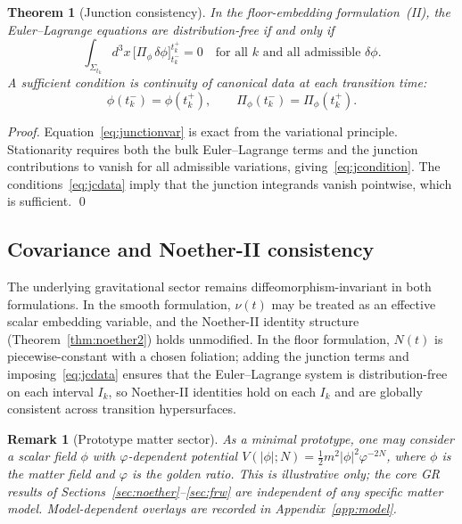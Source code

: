\documentclass[12pt,a4paper]{article}
\newtheorem{theorem}{Theorem}[section]
\newtheorem{remark}{Remark}[section]
\newcommand{\Sig}{\Sigma}           %
\newcommand{\NN}{N}          %
\newcommand{\nnu}{\nu}       %
\begin{document}
\begin{theorem}[Junction consistency]
\label{thm:junction}
In the floor-embedding formulation~(II), the
Euler--Lagrange equations are distribution-free if and only if
\begin{equation}
  \int_{\Sig_{t_k}} d^3x\,\bigl[\Pi_\phi\,\delta\phi\bigr]^{t_k^+}_{t_k^-}
  = 0
  \quad\text{for all }k\text{ and all admissible }\delta\phi.
  \label{eq:jcondition}
\end{equation}
A sufficient condition is continuity of canonical data at
each transition time:
\begin{equation}
  \phi(t_k^-) = \phi(t_k^+), \qquad
  \Pi_\phi(t_k^-) = \Pi_\phi(t_k^+).
  \label{eq:jcdata}
\end{equation}
\end{theorem}

\begin{proof}
Equation~\eqref{eq:junctionvar} is exact from the
variational principle. Stationarity requires both the bulk
Euler--Lagrange terms and the junction contributions to
vanish for all admissible variations, giving~\eqref{eq:jcondition}.
The conditions~\eqref{eq:jcdata} imply that the junction
integrands vanish pointwise, which is sufficient. \qed
\end{proof}

\subsection{Covariance and Noether-II consistency}

The underlying gravitational sector remains
diffeomorphism-invariant in both formulations. In the
smooth formulation, $\nnu(t)$ may be treated as an
effective scalar embedding variable, and the Noether-II
identity structure (Theorem~\ref{thm:noether2}) holds
unmodified. In the floor formulation, $\NN(t)$ is
piecewise-constant with a chosen foliation; adding the
junction terms and imposing~\eqref{eq:jcdata} ensures
that the Euler--Lagrange system is distribution-free on
each interval $I_k$, so Noether-II identities hold
on each $I_k$ and are globally consistent across
transition hypersurfaces.

\begin{remark}[Prototype matter sector]
As a minimal prototype, one may consider a scalar
field $\phi$ with $\varphi$-dependent potential
$V(|\phi|; \NN) = \frac{1}{2}m^2|\phi|^2\varphi^{-2\NN}$,
where $\phi$ is the matter field and $\varphi$ is the
golden ratio.
This is illustrative only; the core GR results of
Sections~\ref{sec:noether}--\ref{sec:frw} are independent
of any specific matter model. Model-dependent overlays
are recorded in Appendix~\ref{app:model}.
\end{remark}
\end{document}
